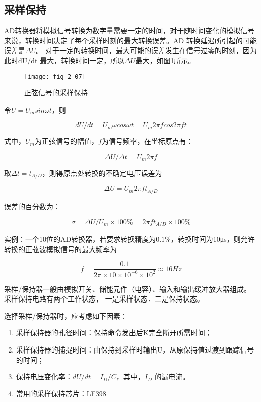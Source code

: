 \subsection{采样保持}

AD转换器将模拟信号转换为数字量需要一定的时间，对于随时间变化的模拟信号来说，转换时间决定了每个采样时刻的最大转换误差。AD 转换延迟所引起的可能误差是$\Delta U$。 对于一定的转换时间，最大可能的误差发生在信号过零的时刻，因为此时dU/dt 最大，转换时间一定，所以$\Delta U$最大，如图\ref{fig_2_07}所示。


\begin{figure}[h]
  \centering
  \texttt{[image: fig\_2\_07]}
  \caption{正弦信号的采样保持}\label{fig_2_07}
\end{figure}


令$U=U_m sin \omega t$，则

\begin{equation}
  dU/dt  =U_m \omega cos \omega t =U_m 2\pi f cos 2\pi ft
\end{equation}

式中，$U_m$为正弦信号的幅值，$f$为信号频率，在坐标原点有：

\begin{equation}
  \Delta U/\Delta t = U_m  2\pi f
\end{equation}

取$\Delta t=t_{A/D}$，则得原点处转换的不确定电压误差为

\begin{equation}
  \Delta U = U_m  2\pi ft_{A/D}
\end{equation}

误差的百分数为：

\begin{equation}
  \sigma =  \Delta U/U_m \times 100\% = 2\pi ft_{A/D}\times 100\%
\end{equation}



实例：一个10位的AD转换器，若要求转换精度为$0.1\%$，转换时间为10μs，则允许转换的正弦波模拟信号的最大频率为

\begin{equation}
  f=\frac{0.1}{2\pi\times10\times10^{-6}\times10^2} \approx 16Hz
\end{equation}

采样/保持器一般由模拟开关、储能元件（电容）、输入和输出缓冲放大器组成。
    采样保持电路有两个工作状态， 一是采样状态．二是保持状态。

选择采样/保持器时，应考虑如下因素：
\begin{enumerate}
  \item 采样保持器的孔径时间：保持命令发出后K完全断开所需时间；

  \item 采样保持器的捕捉时间：由保持到采样时输出U，从原保持值过渡到跟踪信号的时间；

  \item 保持电压变化率：$dU/dt = I_D/C$，其中，$I_D$ 的漏电流。
   \item 常用的采样保持芯片：LF398

\end{enumerate}


